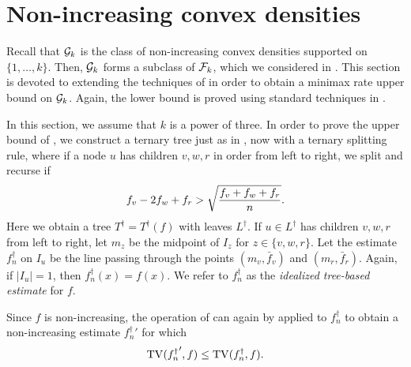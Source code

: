 \section{Non-increasing convex densities}

Recall that $\mathcal{G}_k$ is the class of non-increasing convex densities
supported on $\{1, \dots, k\}$. Then, $\mathcal{G}_k$ forms a subclass of
$\mathcal{F}_k$, which we considered in . This section is
devoted to extending the techniques of  in order to
obtain a minimax rate upper bound on $\mathcal{G}_k$. Again, the lower bound
is proved using standard techniques in .

In this section, we assume that $k$ is a power of three. In order to
prove the upper bound of , we construct a
ternary tree just as in , now with a ternary
splitting rule, where if a node $u$ has children $v, w, r$ in order
from left to right, we split and recurse if
\begin{equation}
  f_v - 2 f_w + f_r > \sqrt{\frac{f_v + f_w + f_r}{n}} . \eqlabel{convex-splitting-rule}
\end{equation}
Here we obtain a tree $T^\dagger = T^\dagger(f)$ with leaves
$L^\dagger$. If $u \in L^\dagger$ has children $v, w, r$ from left to
right, let $m_z$ be the midpoint of $I_z$ for $z \in \{v, w, r\}$. Let
the estimate $f^\dagger_n$ on $I_u$ be the line passing through the
points $(m_v, \bar{f}_v)$ and $(m_r, \bar{f}_r)$. Again, if
$|I_u| = 1$, then $f^\dagger_n(x) = f(x)$. We refer to $f_n^\dagger$
as the \emph{idealized tree-based estimate} for $f$.
\begin{rem}
  Since $f$ is non-increasing, the operation of  can
  again by applied to $f_n^\dagger$ to obtain a non-increasing
  estimate ${f_n^\dagger}'$ for which
  \[
    \operatorname{TV}({f_n^\dagger}', f) \le \operatorname{TV}(f_n^\dagger, f) .
  \]
\end{rem}


